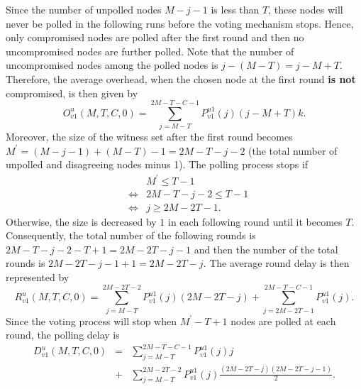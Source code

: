 \documentclass[12pt, onecolumn, draftcls]{IEEEtran}
\begin{document}
Since the number of unpolled nodes $M-j-1$ is less than $T$, these
nodes will never be polled in the following runs before the voting
mechanism stops. Hence, only compromised nodes are polled after the
first round  and then no uncompromised nodes are further polled.
Note that the number of uncompromised nodes among the polled nodes
is $j-(M-T)=j-M+T$. Therefore, the average overhead, when the chosen
node at the first round {\bf is not} compromised, is then given by
\begin{equation}
O_{v1}^u(M,T,C,0) = \sum_{j=M-T}^{2M-T-C-1}P_{v1}^{u1}(j)(j-M+T)k.
\label{eqn:polling_invalid_uncompromised_overhead0}
\end{equation}
Moreover, the size of the witness set after the first round becomes
$M^{\prime}=(M-j-1)+(M-T)-1=2M-T-j-2$ (the total number of unpolled
and disagreeing nodes minus 1). The polling process stops if
\begin{eqnarray*}
&&M^{\prime} \le T-1 \\
& \Leftrightarrow & 2M-T-j-2 \le T-1 \\
& \Leftrightarrow & j \ge 2M-2T-1.
\end{eqnarray*}
Otherwise, the size is decreased by $1$ in each following round
until it becomes $T$. Consequently, the total number of the
following rounds is $2M-T-j-2-T+1=2M-2T-j-1$ and then the number of
the total rounds is $2M-2T-j-1+1=2M-2T-j$. The average round delay
is then represented by
\begin{equation}
R_{v1}^u(M,T,C,0) =
\sum_{j=M-T}^{2M-2T-2}P_{v1}^{u1}(j)(2M-2T-j)+\sum_{j=2M-2T-1}^{2M-T-C-1}P_{v1}^{u1}(j).
\label{eqn:polling_invalid_uncompromised_round_delay0}
\end{equation}
Since the voting process will stop when $M^{\prime}-T+1$ nodes are
polled at each round, the polling delay is
\begin{eqnarray}
D_{v1}^u(M,T,C,0) &=&
\sum_{j=M-T}^{2M-T-C-1}P_{v1}^{u1}(j)j\nonumber\\
&+&\sum^{2M-2T-2}_{j=M-T}P_{v1}^{u1}(j)\frac{(2M-2T-j)(2M-2T-j-1)}{2}.
\label{eqn:polling_invalid_uncompromised_polling_delay0}
\end{eqnarray}
\end{document}
